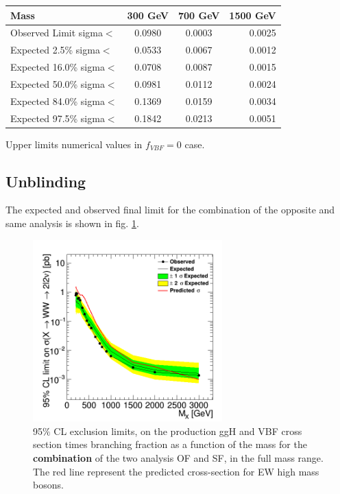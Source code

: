 \begin{center}
  \begin{tabular}{ l | c |c| r }
    \hline
    Mass                    & 300 GeV & 700 GeV  &  1500 GeV                 \\ \hline     
    Observed Limit  sigma$<$&0.0980  & 0.0003   & 0.0025                    \\\hline
    Expected  2.5\% sigma$<$&0.0533  & 0.0067   & 0.0012                   \\\hline
    Expected 16.0\% sigma$<$&0.0708  & 0.0087   & 0.0015                   \\\hline
    Expected 50.0\% sigma$<$&0.0981  & 0.0112   & 0.0024                   \\\hline
    Expected 84.0\% sigma$<$&0.1369  & 0.0159   & 0.0034                   \\\hline
    Expected 97.5\% sigma$<$&0.1842  & 0.0213   & 0.0051                   \\\hline
    
    \hline
  \end{tabular}

\caption{Upper limits numerical values in $f_{VBF}=0$ case.}
    \label{tab:UL_f1}
\end{center}

\newpage


\subsection{Unblinding}
The expected and observed final limit for  the combination of the opposite and same analysis is shown in fig. \ref{fig:sig_OFSF_comb_un}. 

\begin{figure}[htb]
\centering
\includegraphics[width=0.65\textwidth]{Figs/unblinding/Limits/c2_FullComb_unbl.png}
\caption{95$\%$ CL exclusion limits,  on the production ggH and VBF cross section times branching fraction as a function of the mass for the { \bf combination} of the two analysis OF and SF, in the full mass range.   The red  line represent the predicted cross-section for EW high mass bosons.}


    \label{fig:sig_OFSF_comb_un}
\end{figure}




